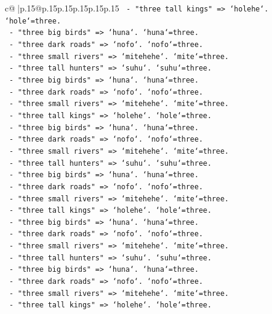 \documentclass{article}
\begin{document}
{\begin{supertabular}{c@{$\;$}|p{.15\linewidth}@{}p{.15\linewidth}p{.15\linewidth}p{.15\linewidth}p{.15\linewidth}p{.15\linewidth}}
{{{\texttt{      {-} "three tall kings" => `holehe`. `hole`=three.} \\
\texttt{      {-} "three big birds" => `huna`. `huna`=three.} \\
\texttt{      {-} "three dark roads" => `nofo`. `nofo`=three.} \\
\texttt{      {-} "three small rivers" => `mitehehe`. `mite`=three.} \\
\texttt{      {-} "three tall hunters" => `suhu`. `suhu`=three.} \\
\texttt{      {-} "three big birds" => `huna`. `huna`=three.} \\
\texttt{      {-} "three dark roads" => `nofo`. `nofo`=three.} \\
\texttt{      {-} "three small rivers" => `mitehehe`. `mite`=three.} \\
\texttt{      {-} "three tall kings" => `holehe`. `hole`=three.} \\
\texttt{      {-} "three big birds" => `huna`. `huna`=three.} \\
\texttt{      {-} "three dark roads" => `nofo`. `nofo`=three.} \\
\texttt{      {-} "three small rivers" => `mitehehe`. `mite`=three.} \\
\texttt{      {-} "three tall hunters" => `suhu`. `suhu`=three.} \\
\texttt{      {-} "three big birds" => `huna`. `huna`=three.} \\
\texttt{      {-} "three dark roads" => `nofo`. `nofo`=three.} \\
\texttt{      {-} "three small rivers" => `mitehehe`. `mite`=three.} \\
\texttt{      {-} "three tall kings" => `holehe`. `hole`=three.} \\
\texttt{      {-} "three big birds" => `huna`. `huna`=three.} \\
\texttt{      {-} "three dark roads" => `nofo`. `nofo`=three.} \\
\texttt{      {-} "three small rivers" => `mitehehe`. `mite`=three.} \\
\texttt{      {-} "three tall hunters" => `suhu`. `suhu`=three.} \\
\texttt{      {-} "three big birds" => `huna`. `huna`=three.} \\
\texttt{      {-} "three dark roads" => `nofo`. `nofo`=three.} \\
\texttt{      {-} "three small rivers" => `mitehehe`. `mite`=three.} \\
\texttt{      {-} "three tall kings" => `holehe`. `hole`=three.} \\
}}}
\end{supertabular}}
\end{document}
